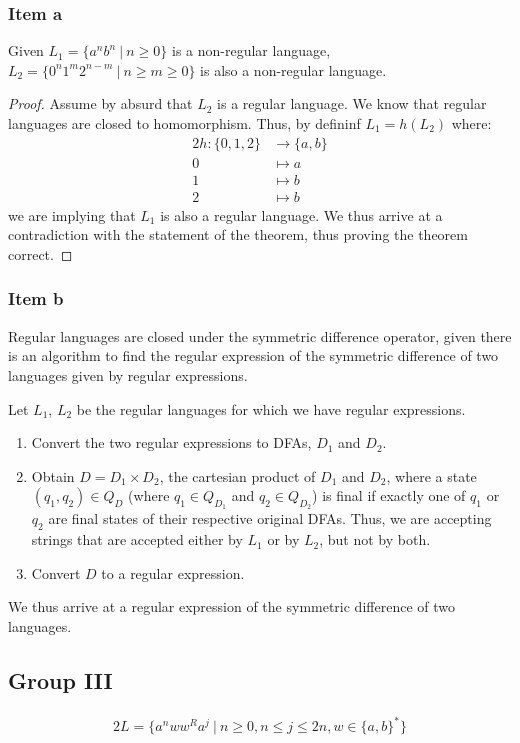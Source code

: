 {\subsubsection{Item a}
\begin{theorem}
	Given $L_1=\{a^n b^n ~|~n \geq 0\}$ is a non-regular language, $L_2=\{0^n 1^m 2^{n-m} ~|~ n \geq m \geq 0\}$ is also a non-regular language.
\end{theorem}
\begin{proof}
	Assume by absurd that $L_2$ is a regular language. We know that regular languages are closed to homomorphism. Thus, by defininf $L_1=h(L_2)$ where:
	\begin{alignat*}{2}
		h \colon \{0,1,2\} &\rightarrow \{a,b\}\\
		0                  &\mapsto a\\
		1                  &\mapsto b\\
		2                  &\mapsto b
	\end{alignat*}
	we are implying that $L_1$ is also a regular language. We thus arrive at a contradiction with the statement of the theorem, thus proving the theorem correct.
\end{proof}
\subsubsection{Item b}
Regular languages are closed under the symmetric difference operator, given there is an algorithm to find the regular expression of the symmetric difference of two languages given by regular expressions.\par
Let $L_1$, $L_2$ be the regular languages for which we have regular expressions.
\begin{enumerate}
	\item Convert the two regular expressions to DFAs, $D_1$ and $D_2$.
	\item Obtain $D=D_1 \times D_2$, the cartesian product of $D_1$ and $D_2$, where a state $(q_1,q_2)\in Q_D$ (where $q_1 \in Q_{D_1}$ and $q_2 \in Q_{D_2}$) is final if exactly one of $q_1$ or $q_2$ are final states of their respective original DFAs. Thus, we are accepting strings that are accepted either by $L_1$ or by $L_2$, but not by both.
	\item Convert $D$ to a regular expression.
\end{enumerate}
We thus arrive at a regular expression of the symmetric difference of two languages.
\pagebreak
\subsection{Group III}
\begin{alignat*}{2}
	L=\{a^n w w^R a^j ~|~n \geq 0, n \leq j \leq 2n, w \in \{a,b\}^*\}
\end{alignat*}
}
